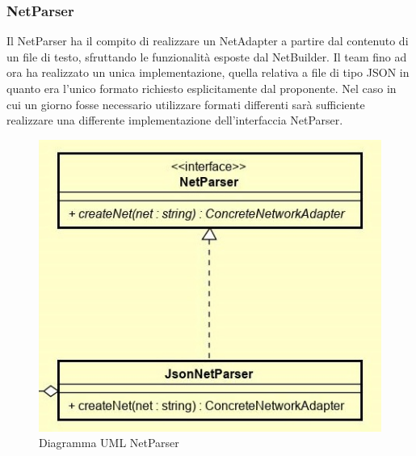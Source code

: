\subsubsection{NetParser}
Il NetParser ha il compito di realizzare un NetAdapter a partire dal contenuto di un file di testo, sfruttando le funzionalità esposte dal NetBuilder.
Il team fino ad ora ha realizzato un unica implementazione, quella relativa a file di tipo JSON in quanto era l'unico formato richiesto esplicitamente dal proponente.
Nel caso in cui un giorno fosse necessario utilizzare formati differenti sarà sufficiente realizzare una differente implementazione dell'interfaccia NetParser.
\begin{figure} [H]
	\centering
	\includegraphics[scale=1]{Img/NetParser}
	\caption{Diagramma UML NetParser}\label{}
\end{figure}
